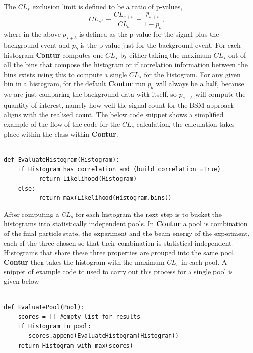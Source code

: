The $CL_s$ exclusion limit is defined to be a ratio of p-values,
$$ CL_s: = \frac{CL_{s+b}}{CL_{b}} = \frac{p_{s+b}}{1- p_{b}}, $$
where in the above $p_{s+b}$ is defined as the p-value for the signal plus the background event and $p_{b}$ is the p-value just for the background event. For each histogram \textbf{Contur} computes one $CL_{s}$ by either taking the maximum $CL_{s}$ out of all the bins that compose the histogram or if correlation information between the bins exists using this to compute a single $CL_s$ for the histogram. For any given bin in a histogram, for the default \textbf{Contur} run $p_b$ will always be a half, because we are just comparing the background data with itself, so $p_{s+b}$ will compute the quantity of interest, namely how well the signal count for the BSM approach aligns with the realised count. The below code snippet shows a simplified example of the  flow of the code for the $CL_s$ calculation, the calculation takes place within the  class within \textbf{Contur}.

\begin{code}
\label{code:histo}
\begin{verbatim}

def EvaluateHistogram(Histogram):
    if Histogram has correlation and (build correlation =True)
          return Likelihood(Histogram)
    else:
          return max(Likelihood(Histogram.bins))
\end{verbatim}
\end{code}

After computing a $CL_{s}$ for each histogram the next step is to bucket the histograms into statistically independent pools. In \textbf{Contur} a pool is combination of the final particle state, the experiment and the beam energy of the experiment, each of the three chosen so that their combination is statistical independent. Histograms that share these three properties are grouped into the same pool. \textbf{Contur} then takes the histogram with the maximum $CL_s$ in each pool. A snippet of example code to used to carry out this process for a single pool is given below

\begin{code}
\label{code:pools}
\begin{verbatim}

def EvaluatePool(Pool):
    scores = [] #empty list for results
    if Histogram in pool:
       scores.append(EvaluateHistogram(Histogram))
    return Histogram with max(scores)
\end{verbatim}
\end{code}

